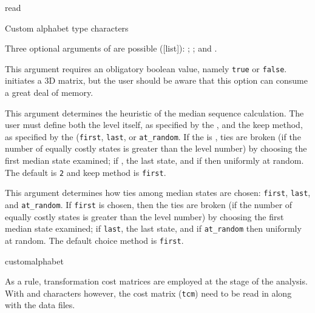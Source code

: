 \begin{command}{read}{}
\begin{arguments}
\begin{argumentgroup}{Custom alphabet type characters}
{	Three optional arguments of  are possible ([\poylident list]): 
	; ; and .  

	\begin{description}
	
	 {\obligatory \poybool}
	{This argument requires an obligatory boolean value, namely \texttt{true} or \texttt{false}.
	  initiates a 3D matrix, but the user should be aware 
	that this option can consume a great deal of memory.}
	{}

	{This argument determines the heuristic  of the median sequence calculation.  
	The user must define both the level itself, as specified by the \poyint, and the keep method, as specified 
	by the \poylident (\texttt{first}, \texttt{last}, or \texttt{at\_random}.  If the \poylident is , 
	ties are broken (if the number of equally costly states is greater than the level number) by choosing the 
	first median state examined; if , the last state, and if 
	 then uniformly at random. The default 	 is \texttt{2} and keep method is \texttt{first}.  }
	{}
	
	 {\obligatory \poylident}
	{This argument determines how ties among median states are chosen: \texttt{first}, \texttt{last}, 
	and \texttt{at\_random}.  If \texttt{first} is chosen, 	then the ties are broken (if the number of 
	equally costly states is greater than the level number) by choosing the first median state examined; 
	if \texttt{last}, the last state, and if \texttt{at\_random} then uniformly at random. The default choice method is \texttt{first}.}
	{}
	
\end{description}

	}
	 {customalphabet}
	 
\end{argumentgroup}

            \begin{statement}
            As a rule, transformation cost matrices are employed at the  stage of the
            analysis.  With  and  characters however, 
            the cost matrix (\texttt{tcm}) need to  be read in along with the data files.
            \end{statement}


\end{arguments}
\end{command}
